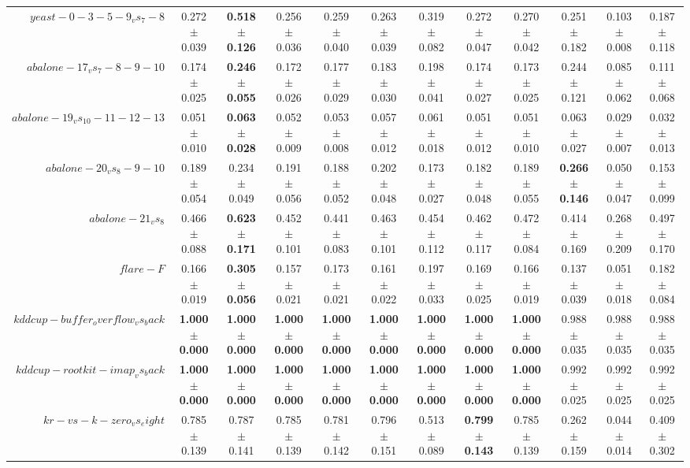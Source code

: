 \begin{table}[!ht]
{\begin{tabular}{r c c c c c c c c c c c}
$yeast-0-3-5-9_vs_7-8$ & 0.272 $\pm$ 0.039 & \textbf{0.518 $\pm$ 0.126} & 0.256 $\pm$ 0.036 & 0.259 $\pm$ 0.040 & 0.263 $\pm$ 0.039 & 0.319 $\pm$ 0.082 & 0.272 $\pm$ 0.047 & 0.270 $\pm$ 0.042 & 0.251 $\pm$ 0.182 & 0.103 $\pm$ 0.008 & 0.187 $\pm$ 0.118 \\
$abalone-17_vs_7-8-9-10$ & 0.174 $\pm$ 0.025 & \textbf{0.246 $\pm$ 0.055} & 0.172 $\pm$ 0.026 & 0.177 $\pm$ 0.029 & 0.183 $\pm$ 0.030 & 0.198 $\pm$ 0.041 & 0.174 $\pm$ 0.027 & 0.173 $\pm$ 0.025 & 0.244 $\pm$ 0.121 & 0.085 $\pm$ 0.062 & 0.111 $\pm$ 0.068 \\
$abalone-19_vs_10-11-12-13$ & 0.051 $\pm$ 0.010 & \textbf{0.063 $\pm$ 0.028} & 0.052 $\pm$ 0.009 & 0.053 $\pm$ 0.008 & 0.057 $\pm$ 0.012 & 0.061 $\pm$ 0.018 & 0.051 $\pm$ 0.012 & 0.051 $\pm$ 0.010 & 0.063 $\pm$ 0.027 & 0.029 $\pm$ 0.007 & 0.032 $\pm$ 0.013 \\
$abalone-20_vs_8-9-10$ & 0.189 $\pm$ 0.054 & 0.234 $\pm$ 0.049 & 0.191 $\pm$ 0.056 & 0.188 $\pm$ 0.052 & 0.202 $\pm$ 0.048 & 0.173 $\pm$ 0.027 & 0.182 $\pm$ 0.048 & 0.189 $\pm$ 0.055 & \textbf{0.266 $\pm$ 0.146} & 0.050 $\pm$ 0.047 & 0.153 $\pm$ 0.099 \\
$abalone-21_vs_8$ & 0.466 $\pm$ 0.088 & \textbf{0.623 $\pm$ 0.171} & 0.452 $\pm$ 0.101 & 0.441 $\pm$ 0.083 & 0.463 $\pm$ 0.101 & 0.454 $\pm$ 0.112 & 0.462 $\pm$ 0.117 & 0.472 $\pm$ 0.084 & 0.414 $\pm$ 0.169 & 0.268 $\pm$ 0.209 & 0.497 $\pm$ 0.170 \\
$flare-F$ & 0.166 $\pm$ 0.019 & \textbf{0.305 $\pm$ 0.056} & 0.157 $\pm$ 0.021 & 0.173 $\pm$ 0.021 & 0.161 $\pm$ 0.022 & 0.197 $\pm$ 0.033 & 0.169 $\pm$ 0.025 & 0.166 $\pm$ 0.019 & 0.137 $\pm$ 0.039 & 0.051 $\pm$ 0.018 & 0.182 $\pm$ 0.084 \\
$kddcup-buffer_overflow_vs_back$ & \textbf{1.000 $\pm$ 0.000} & \textbf{1.000 $\pm$ 0.000} & \textbf{1.000 $\pm$ 0.000} & \textbf{1.000 $\pm$ 0.000} & \textbf{1.000 $\pm$ 0.000} & \textbf{1.000 $\pm$ 0.000} & \textbf{1.000 $\pm$ 0.000} & \textbf{1.000 $\pm$ 0.000} & 0.988 $\pm$ 0.035 & 0.988 $\pm$ 0.035 & 0.988 $\pm$ 0.035 \\
$kddcup-rootkit-imap_vs_back$ & \textbf{1.000 $\pm$ 0.000} & \textbf{1.000 $\pm$ 0.000} & \textbf{1.000 $\pm$ 0.000} & \textbf{1.000 $\pm$ 0.000} & \textbf{1.000 $\pm$ 0.000} & \textbf{1.000 $\pm$ 0.000} & \textbf{1.000 $\pm$ 0.000} & \textbf{1.000 $\pm$ 0.000} & 0.992 $\pm$ 0.025 & 0.992 $\pm$ 0.025 & 0.992 $\pm$ 0.025 \\
$kr-vs-k-zero_vs_eight$ & 0.785 $\pm$ 0.139 & 0.787 $\pm$ 0.141 & 0.785 $\pm$ 0.139 & 0.781 $\pm$ 0.142 & 0.796 $\pm$ 0.151 & 0.513 $\pm$ 0.089 & \textbf{0.799 $\pm$ 0.143} & 0.785 $\pm$ 0.139 & 0.262 $\pm$ 0.159 & 0.044 $\pm$ 0.014 & 0.409 $\pm$ 0.302 \\

\end{tabular}}
\end{table}
